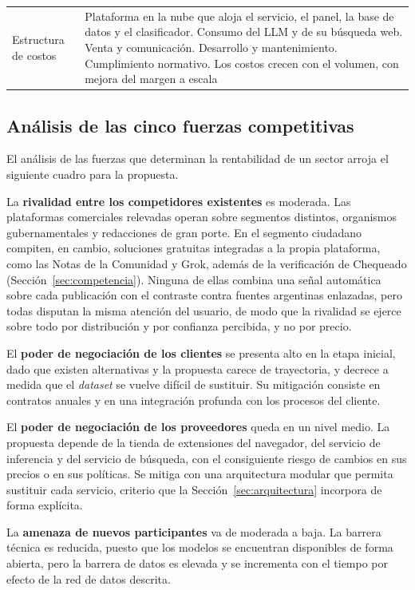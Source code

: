 \begin{small}
\begin{longtable}{@{}p{3.2cm} p{11cm}@{}}
  Estructura de costos & Plataforma en la nube que aloja el servicio, el panel, la base de datos y el clasificador. Consumo del LLM y de su búsqueda web. Venta y comunicación. Desarrollo y mantenimiento. Cumplimiento normativo. Los costos crecen con el volumen, con mejora del margen a escala \\
\end{longtable}
\end{small}

\subsection{Análisis de las cinco fuerzas competitivas}

El análisis de las fuerzas que determinan la rentabilidad de un sector \parencite{Porter2008} arroja el siguiente cuadro para la propuesta.

La \textbf{rivalidad entre los competidores existentes} es moderada. Las plataformas comerciales relevadas operan sobre segmentos distintos, organismos gubernamentales y redacciones de gran porte. En el segmento ciudadano compiten, en cambio, soluciones gratuitas integradas a la propia plataforma, como las Notas de la Comunidad y Grok, además de la verificación de Chequeado (Sección~\ref{sec:competencia}). Ninguna de ellas combina una señal automática sobre cada publicación con el contraste contra fuentes argentinas enlazadas, pero todas disputan la misma atención del usuario, de modo que la rivalidad se ejerce sobre todo por distribución y por confianza percibida, y no por precio.

El \textbf{poder de negociación de los clientes} se presenta alto en la etapa inicial, dado que existen alternativas y la propuesta carece de trayectoria, y decrece a medida que el \textit{dataset} se vuelve difícil de sustituir. Su mitigación consiste en contratos anuales y en una integración profunda con los procesos del cliente.

El \textbf{poder de negociación de los proveedores} queda en un nivel medio. La propuesta depende de la tienda de extensiones del navegador, del servicio de inferencia y del servicio de búsqueda, con el consiguiente riesgo de cambios en sus precios o en sus políticas. Se mitiga con una arquitectura modular que permita sustituir cada servicio, criterio que la Sección~\ref{sec:arquitectura} incorpora de forma explícita.

La \textbf{amenaza de nuevos participantes} va de moderada a baja. La barrera técnica es reducida, puesto que los modelos se encuentran disponibles de forma abierta, pero la barrera de datos es elevada y se incrementa con el tiempo por efecto de la red de datos descrita.

